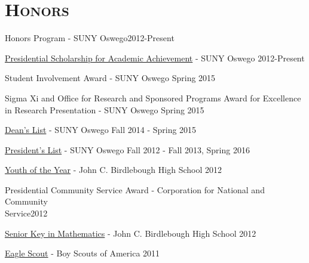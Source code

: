 \documentclass[8pt]{article}
\renewenvironment{itemize}{
  \begin{list}{}{
    \setlength{\leftmargin}{1.5em}
  }
}{
  \end{list}
}
\begin{document}
\section*{\textsc{Honors}}

\begin{itemize}
\item Honors Program - SUNY Oswego\hfill 2012-Present
\item \href{http://oswegocountytoday.com/local-residents-receive-suny-oswego-scholarships/}{Presidential Scholarship for Academic Achievement} - SUNY Oswego  \hfill 2012-Present
\item Student Involvement Award - SUNY Oswego \hfill Spring 2015
\item Sigma Xi and Office for Research and Sponsored Programs Award for Excellence in Research Presentation - SUNY Oswego \hfill Spring 2015
\item \href{http://meritpages.com/Kroffo}{Dean's List} - SUNY Oswego \hfill Fall 2014 - Spring 2015
\item \href{http://meritpages.com/Kroffo}{President's List} - SUNY Oswego \hfill Fall 2012 - Fall 2013, Spring 2016
\item \href{http://www.oswegocountyweeklies.com/phoenix_register.php?details&story_id=5101&story_year=2012&story_month=5}{Youth of the Year} - John C. Birdlebough High School \hfill 2012
\item Presidential Community Service Award - Corporation for National and Community \\Service\hfill 2012
\item \href{http://www.oswegocountyweeklies.com/phoenix_register.php?details&story_id=5503&story_year=2012&story_month=6}{Senior Key in Mathematics} - John C. Birdlebough High School \hfill 2012
\item \href{http://www.oswegocountyweeklies.com/phoenix_register.php?details&story_id=6083&story_year=2012&story_month=8}{Eagle Scout} - Boy Scouts of America \hfill 2011
\end{itemize}
\end{document}

